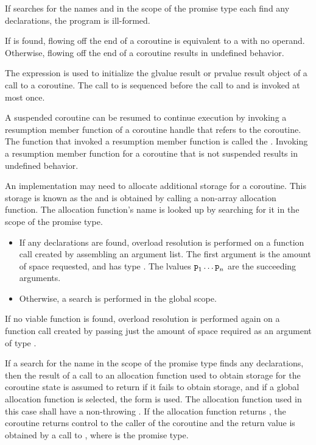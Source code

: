 \pnum
If searches for the names  and 
in the scope of the promise type each find any declarations,
the program is ill-formed.
\begin{note}
If  is found, flowing off
the end of a coroutine is equivalent to a  with no operand.
Otherwise, flowing off the end of a coroutine
results in undefined behavior.
\end{note}

\pnum
The expression  is used
to initialize
the glvalue result or prvalue result object of a call to a coroutine.
The call to 
is sequenced before
the call to 
and is invoked at most once.

\pnum
A suspended coroutine can be resumed to continue execution by invoking
a resumption member function
of a coroutine handle
that refers to the coroutine.
The function that invoked a resumption member function is
called the .
Invoking a resumption member function for a coroutine
that is not suspended results in undefined behavior.

\pnum
An implementation may need to allocate additional storage for a coroutine.
This storage is known as the  and is obtained by calling
a non-array allocation function.
The allocation function's name is looked up by searching for it in the scope of the promise type.
\begin{itemize}
\item
If any declarations are found,
overload resolution is performed on a function call created by assembling an
argument list. The first argument is the amount of space requested, and has
type .
The lvalues $\texttt{p}_1 \dotsc \texttt{p}_n$ are the succeeding arguments.
\item
Otherwise, a search is performed in the global scope.
\end{itemize}
If no viable function is found,
overload resolution is performed again
on a function call created by passing just
the amount of space required as an argument of type .

\pnum
If a search for the name 
in the scope of the promise type finds
any declarations, then the result
of a call to an allocation function used to obtain storage for the coroutine
state is assumed to return  if it fails to obtain storage,
and if a global allocation function is selected,
the  form is used.
The allocation function used in this case shall have a non-throwing
.
If the allocation function returns , the coroutine returns
control to the caller of the coroutine and the return value is obtained by a
call to , where 
is the promise type.

